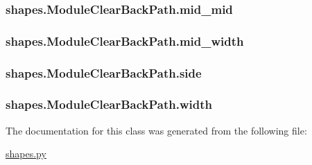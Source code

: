 \subsubsection[{mid\+\_\+mid}]{\setlength{\rightskip}{0pt plus 5cm}shapes.\+Module\+Clear\+Back\+Path.\+mid\+\_\+mid}\label{classshapes_1_1_module_clear_back_path_a8b42577e0da207b9898189e1e4aa8223}
\hypertarget{classshapes_1_1_module_clear_back_path_aa3cf5e734ca237d66bcb547d069f12b3}{}
\subsubsection[{mid\+\_\+width}]{\setlength{\rightskip}{0pt plus 5cm}shapes.\+Module\+Clear\+Back\+Path.\+mid\+\_\+width}\label{classshapes_1_1_module_clear_back_path_aa3cf5e734ca237d66bcb547d069f12b3}
\hypertarget{classshapes_1_1_module_clear_back_path_ae9b4de4bb691ca879b444b0ef8a56f09}{}
\subsubsection[{side}]{\setlength{\rightskip}{0pt plus 5cm}shapes.\+Module\+Clear\+Back\+Path.\+side}\label{classshapes_1_1_module_clear_back_path_ae9b4de4bb691ca879b444b0ef8a56f09}
\hypertarget{classshapes_1_1_module_clear_back_path_aa57e0254bc676db2ca4999168d7b568c}{}
\subsubsection[{width}]{\setlength{\rightskip}{0pt plus 5cm}shapes.\+Module\+Clear\+Back\+Path.\+width}\label{classshapes_1_1_module_clear_back_path_aa57e0254bc676db2ca4999168d7b568c}


The documentation for this class was generated from the following file\+:\begin{DoxyCompactItemize}
\item 
\hyperlink{shapes_8py}{shapes.\+py}\end{DoxyCompactItemize}
